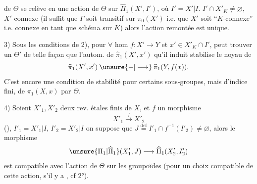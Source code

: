 
de $\Theta$ se relève en une action de $\Theta$ sur $\widehat{\Pi}_1(X',I')$, où $I'=X'\vert I$.
 $I'\cap X'_K\ne\varnothing$, $X'$  connexe (il suffit que $\Gamma$ soit transitif sur $\pi_0(X')$ i.e. que $X'$ soit ``$K$-connexe'' i.e. connexe en tant que schéma sur $K$) alors l'action remontée est unique.


3) Sous les conditions de 2), pour $\forall$ hom $f:X'\longrightarrow Y$ et  $x'\in X'_K\cap I'$,   peut trouver un $\Theta'$  de telle façon que l'autom. de $\widehat{\pi}_1(X',x')$ qu'il induit  stabilise le noyau de
\[
\widehat{\pi}_1(X',x')\mathbin{\unsure{-|\longrightarrow}}\widehat{\pi}_1(Y,f(x)).
\]
C'est encore une condition de stabilité pour certains sous-groupes, mais  d'indice fini, de $\pi_1(X,x)$ par $\Theta$.


4) Soient $X'_1,X'_2$ deux rev. étales finis de $X$, et $f$ un morphisme
\[
X'_1\xrightarrow{f}X'_2
\]
(), $I'_1=X'_1\vert I$, $I'_2=X'_2\vert I$ on suppose  que $J\overset{\mathrm{def}}=I'_1\cap f^{-1}(I'_2)\ne\varnothing$,   alors  le morphisme
\[
\unsure{\Pi_1|\widehat{\Pi}_1}(X'_1,J)\longrightarrow\widehat{\Pi}_1(X'_2,I'_2)
\]
est compatible avec l'action  de $\Theta$ sur les groupoïdes (pour un choix compatible de cette action, s'il y a , cf 2°).
